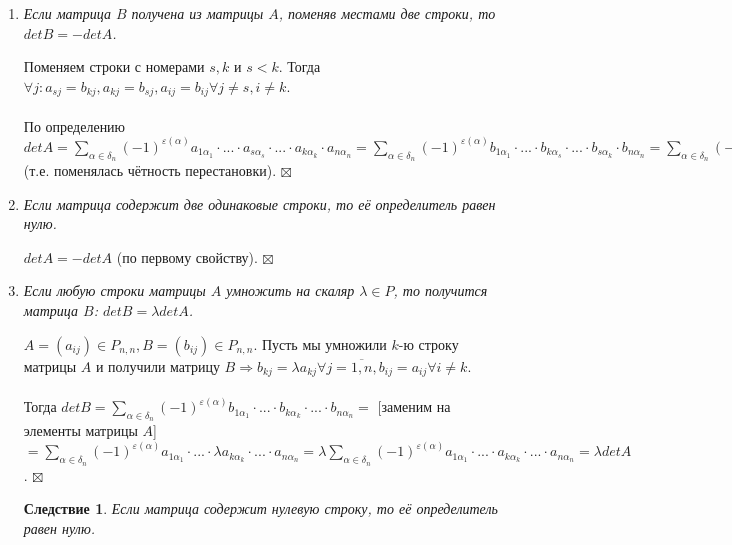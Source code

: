 \documentclass[a4paper, 12pt]{report}
\newenvironment{Proof} %
{\par\noindent{$\blacklozenge$}} %
{\hfill$\scriptstyle\boxtimes$}
\begin{document}
	\begin{enumerate}
		\item\textit{ Если матрица $B$ получена из матрицы $A$, поменяв местами две строки, то $det B = -det A$.}
		\begin{Proof}
			Поменяем строки с номерами $s, k$ и $s < k$. Тогда $\forall j: a_{sj} = b_{kj}, a_{kj} = b_{sj}, a_{ij} = b_{ij} \forall j \ne s, i \ne k$.\\\\
			По определению $det A = \sum\limits_{\alpha \in \delta_n} (-1)^{\varepsilon(\alpha)}a_{1\alpha_1} \cdot ... \cdot a_{s\alpha_s}\cdot ... \cdot a_{k\alpha_k} \cdot a_{n\alpha_n} = \sum\limits_{\alpha \in \delta_n} (-1)^{\varepsilon(\alpha)}b_{1\alpha_1} \cdot ... \cdot b_{k\alpha_s}\cdot ... \cdot b_{s\alpha_k} \cdot b_{n\alpha_n} = \sum\limits_{\alpha \in \delta_n} (-1)^{\varepsilon(\alpha_1...\alpha_k...\alpha_s...\alpha_n)}b_{1\alpha_1} \cdot ... \cdot b_{s\alpha_s}\cdot ... \cdot b_{k\alpha_k} \cdot b_{n\alpha_n} = -det B$ (т.е. поменялась чётность перестановки).
		\end{Proof} 
		\item \textit{Если матрица содержит две одинаковые строки, то её определитель равен нулю.}
		\begin{Proof}
			$det A = - det A$ (по первому свойству).
		\end{Proof}
		\item\textit{ Если любую строки матрицы $A$ умножить на скаляр $\lambda \in P$, то получится матрица $B$: $det B = \lambda det A$.}
		\begin{Proof}
			$A = (a_{ij}) \in P_{n,n}, B = (b_{ij}) \in P_{n, n}$. Пусть мы умножили $k$-ю строку матрицы $A$ и получили матрицу $B \Rightarrow b_{kj} = \lambda a_{kj} \forall j = \overline{1, n}, b_{ij} = a_{ij} \forall i \ne k$.\\\\
			Тогда $det B = \sum\limits_{\alpha \in \delta_n} (-1)^{\varepsilon(\alpha)}b_{1\alpha_1} \cdot ... \cdot b_{k\alpha_k}  \cdot  ... \cdot b_{n\alpha_n} = $ [заменим на элементы матрицы $A$] $= \sum\limits_{\alpha \in \delta_n} (-1)^{\varepsilon(\alpha)}a_{1\alpha_1} \cdot ... \cdot \lambda a_{k\alpha_k} \cdot  ... \cdot a_{n\alpha_n} = \lambda\sum\limits_{\alpha \in \delta_n} (-1)^{\varepsilon(\alpha)}a_{1\alpha_1} \cdot ... \cdot a_{k\alpha_k}  \cdot  ... \cdot a_{n\alpha_n} = \lambda det A$.
		\end{Proof}
		\newtheorem*{cor41_1}{Следствие}\begin{cor41_1} Если матрица содержит нулевую строку, то её определитель равен нулю.

\end{cor41_1}
\end{enumerate}
\end{document}
